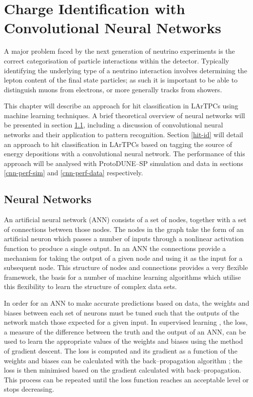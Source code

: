 \chapter{\label{ch:5-chargeid}Charge Identification with Convolutional Neural 
Networks} 

\minitoc

\noindent A major problem faced by the next generation of neutrino experiments
is the correct categorisation of particle interactions within the detector.
Typically identifying the underlying type of a neutrino interaction involves
determining the lepton content of the final state particles; as such it is
important to be able to distinguish muons from electrons, or more generally
tracks from showers.

This chapter will describe an approach for hit classification in LArTPCs using
machine learning techniques. A brief theoretical overview of neural networks
will be presented in section \ref{ml}, including a discussion of convolutional
neural networks and their application to pattern recognition. Section
\ref{hit-id} will detail an approach to hit classification in LArTPCs based on
tagging the source of energy depositions with a convolutional neural network.
The performance of this approach will be analysed with ProtoDUNE--SP simulation
and data in sections \ref{cnn-perf-sim} and \ref{cnn-perf-data} respectively.

\section{Neural Networks} \label{ml}

An artificial neural network (ANN) consists of a set of nodes, together with a
set of connections between those nodes. The nodes in the graph take the form of
an artificial neuron which passes a number of inputs through a nonlinear
activation function to produce a single output. In an ANN the connections
provide a mechanism for taking the output of a given node and using it as the
input for a subsequent node. This structure of nodes and connections provides a
very flexible framework, the basis for a number of machine learning algorithms
which utilise this flexibility to learn the structure of complex data sets.

In order for an ANN to make accurate predictions based on data, the weights and
biases between each set of neurons must be tuned such that the outputs of the
network match those expected for a given input. In supervised learning
\cite{Reed:1998:NSS:552600}, the loss, a measure of the difference between the
truth and the output of an ANN, can be used to learn the appropriate values of
the weights and biases using the method of gradient descent. The loss is
computed and its gradient as a function of the weights and biases can be
calculated with the back--propagation algorithm \cite{Rumelhart1986}; the loss
is then minimised based on the gradient calculated with back--propagation. This
process can be repeated until the loss function reaches an acceptable level or
stops decreasing.

